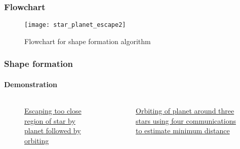 \begin{frame}
\frametitle{\small Flowchart}
\begin{figure}[H]
	\centering
	\texttt{[image: star\_planet\_escape2]}
	\caption{Flowchart for shape formation algorithm}
	\label{fig:fc_shape_form}
\end{figure}
\end{frame}
\begin{frame}
	\frametitle{Shape formation}
	\framesubtitle{Demonstration}
	\begin{columns}
	\begin{column}{0.5\textwidth}
	\begin{figure}[H]
		\centering
		\hspace{5cm}
		\caption{\href{https://youtu.be/X6dGCLT0ho8}{Escaping too close region of star by planet followed by orbiting}}
		\label{fig:shape_formation_demo}
	\end{figure}
	\end{column}
	\begin{column}{0.5\textwidth}
		\begin{figure}[H]
			\centering
			\hspace{5cm}
			\caption{\href{https://youtu.be/5aZm0Os9BPc}{Orbiting of planet around three stars using four communications to estimate minimum distance}}
			\label{fig:shape_formation_demo}
		\end{figure}
	\end{column}
	\end{columns}
\end{frame}